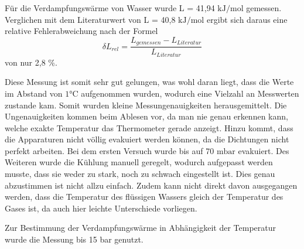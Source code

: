 Für die Verdampfungswärme von Wasser wurde L = 41,94 $\si{\kilo \joule \per \mol}$
gemessen. Verglichen mit dem Literaturwert von L = 40,8 $\si{\kilo \joule \per \mol}$
\cite{chemie} ergibt sich daraus eine relative Fehlerabweichung nach der Formel
\begin{equation}
  \delta L_{rel} = \frac{L_{gemessen}-L_{Literatur}}{L_{Literatur}}
\end{equation}
von nur 2,8 \%.

Diese Messung ist somit sehr gut gelungen, was wohl daran liegt, dass die
Werte im Abstand von $1 \si{\celsius}$ aufgenommen wurden, wodurch eine Vielzahl
an Messwerten zustande kam. Somit wurden kleine Messungenauigkeiten herausgemittelt.
Die Ungenauigkeiten kommen beim Ablesen vor, da man nie genau erkennen kann, welche
exakte Temperatur das Thermometer gerade anzeigt. Hinzu kommt, dass die Apparaturen
nicht völlig evakuiert werden können, da die Dichtungen nicht perfekt arbeiten. Bei
dem ersten Versuch wurde bis auf 70 $\si{\milli \bar}$ evakuiert. Des Weiteren
wurde die Kühlung manuell geregelt, wodurch aufgepasst werden musste, dass sie weder
zu stark, noch zu schwach eingestellt ist. Dies genau abzustimmen ist nicht
allzu einfach. Zudem kann nicht direkt davon ausgegangen werden, dass die Temperatur
des flüssigen Wassers gleich der Temperatur des Gases ist, da auch hier leichte
Unterschiede vorliegen.

Zur Bestimmung der Verdampfungswärme in Abhängigkeit der Temperatur wurde die Messung
bis 15 bar genutzt.
